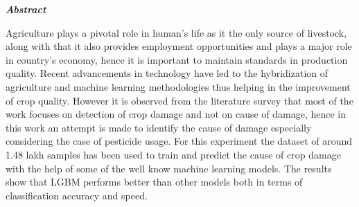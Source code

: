 \begin{center}
\emph{\LARGE\textbf {Abstract}}\\[2.5cm]
\end{center}


\doublespacing
Agriculture plays a pivotal role in human’s life as it the only source of livestock, along with that it also provides employment opportunities and plays a major role in country’s economy, hence it is important to maintain standards in production quality. Recent advancements in technology have led to the hybridization of agriculture and machine learning methodologies thus helping in the improvement of crop quality. However it is observed from the literature survey that most of the work focuses on detection of crop damage and not on cause of damage, hence in this work an attempt is made to identify the cause of damage especially considering the case of pesticide usage. For this experiment the dataset of around 1.48 lakh samples has been used to train and predict the cause of crop damage with the help of some of the well know machine learning models. The results show that LGBM performs better than other models both in terms of classification accuracy and speed. 
\vspace*{4cm}



